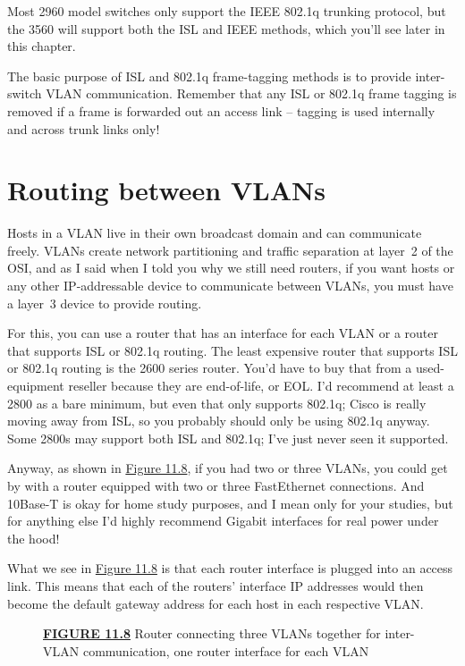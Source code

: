Most 2960 model switches only support the IEEE 802.1q trunking protocol,
but the 3560 will support both the ISL and IEEE methods, which you'll
see later in this chapter.

\begin{note}
The basic purpose of ISL and 802.1q frame-tagging methods is to provide inter-switch VLAN communication.
Remember that any ISL or 802.1q frame tagging is removed if a frame is forwarded out an access link -- tagging is used internally and across trunk links only!
\end{note}


\section{Routing between VLANs}

Hosts in a VLAN live in their own broadcast domain and can communicate freely.
VLANs create network partitioning and traffic separation at layer~2 of the OSI, and as I said when I told you why we still need
routers, if you want hosts or any other IP-addressable device to communicate between VLANs, you must have a layer~3 device to provide routing.

For this, you can use a router that has an interface for each VLAN or a
router that supports ISL or 802.1q routing. The least expensive router
that supports ISL or 802.1q routing is the 2600 series router. You'd
have to buy that from a used-equipment reseller because they are
end-of-life, or EOL. I'd recommend at least a 2800 as a bare minimum,
but even that only supports 802.1q; Cisco is really moving away from
ISL, so you probably should only be using 802.1q anyway. Some 2800s may
support both ISL and 802.1q; I've just never seen it supported.

Anyway, as shown in
\protect\hyperlink{c11.xhtmlux5cux23figure11-8}{Figure 11.8}, if you had
two or three VLANs, you could get by with a router equipped with two or
three FastEthernet connections. And 10Base-T is okay for home study
purposes, and I mean only for your studies, but for anything else I'd
highly recommend Gigabit interfaces for real power under the hood!

What we see in \protect\hyperlink{c11.xhtmlux5cux23figure11-8}{Figure
11.8} is that each router interface is plugged into an access link. This
means that each of the routers' interface IP addresses would then become
the default gateway address for each host in each respective VLAN.

\begin{figure}
\centering
\caption{{\protect\hyperlink{c11.xhtmlux5cux23figureanchor11-8}{\textbf{FIGURE
11.8}} Router connecting three VLANs together for inter-VLAN
communication, one router interface for each VLAN}}
\end{figure}

